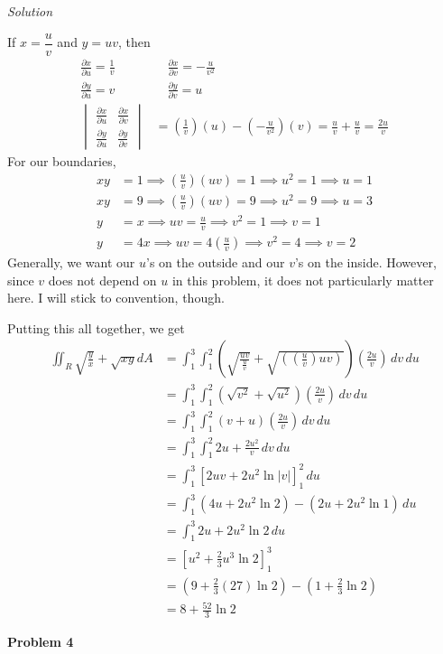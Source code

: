 \documentclass{article}
\newcommand{\lrp}[1]{\left( #1 \right)}
\newcommand{\lrb}[1]{\left[ #1 \right]}
\newcommand{\Solution}{\textit{Solution}}
\begin{document}
\Solution

If $x=\dfrac{u}{v}$ and $y=uv$, then
\begin{align*}
    \frac{\partial x}{\partial u}=\frac{1}{v}&\hspace{1em}\frac{\partial x}{\partial v}=-\frac{u}{v^2}\\
    \frac{\partial y}{\partial u}=v&\hspace{1em}\frac{\partial y}{\partial v}=u\\
    \begin{vmatrix}
    \frac{\partial x}{\partial u} & \frac{\partial x}{\partial v}\\
    \frac{\partial y}{\partial u} & 
    \frac{\partial y}{\partial v}
    \end{vmatrix}&= \lrp{\frac{1}{v}}(u)-\lrp{-\frac{u}{v^2}}(v)=\frac{u}{v}+\frac{u}{v}=\frac{2u}{v}
\end{align*}
For our boundaries,
\begin{align*}
    xy&=1\implies \lrp{\frac{u}{v}}(uv)=1\implies u^2 = 1\implies u =1 \tag{$u,v>0$}\\
    xy&=9\implies \lrp{\frac{u}{v}}(uv)=9\implies u^2 = 9\implies u = 3 \tag{$u,v>0$}\\
    y&=x\implies uv=\frac{u}{v}\implies v^2 = 1\implies v=1\tag{$u,v>0$}\\
    y&=4x\implies uv=4\lrp{\frac{u}{v}}\implies v^2 = 4\implies v=2\tag{$u,v>0$}
\end{align*}
Generally, we want our $u$'s on the outside and our $v$'s on the inside. However, since $v$ does not depend on $u$ in this problem, it does not particularly matter here. I will stick to convention, though.

Putting this all together, we get
\begin{align*}
    \iint_R \sqrt{\frac{y}{x}}+\sqrt{xy}dA&=\int_1^3\int_1^2 \lrp{\sqrt{\frac{uv}{\frac{u}{v}}}+\sqrt{\lrp{\lrp{\frac{u}{v}}uv}}}\lrp{\frac{2u}{v}}\,dv\,du\\
    &=\int_1^3\int_1^2 \lrp{\sqrt{v^2}+\sqrt{u^2}}\lrp{\frac{2u}{v}}\,dv\,du\\
    &=\int_1^3\int_1^2 \lrp{v+u}\lrp{\frac{2u}{v}}\,dv\,du\\
    &=\int_1^3\int_1^2 2u + \frac{2u^2}{v}\,dv\,du\\
    &=\int_1^3\lrb{2uv+2u^2\ln\left|v\right|}_1^2\,du\\
    &=\int_1^3 \lrp{4u +2u^2 \ln 2}-\lrp{2u+2u^2\ln 1}\,du\\
    &= \int_1^3 2u +2u^2\ln 2\,du\\
    &=\lrb{u^2 +\frac{2}{3}u^3\ln 2}_1^3\\
    &=\lrp{9 + \frac{2}{3}(27)\ln 2}-\lrp{1 + \frac{2}{3}\ln 2}\\
    &=\boxed{8 +\frac{52}{3}\ln 2}
\end{align*}
{}\textbf{Problem 4}
\end{document}
